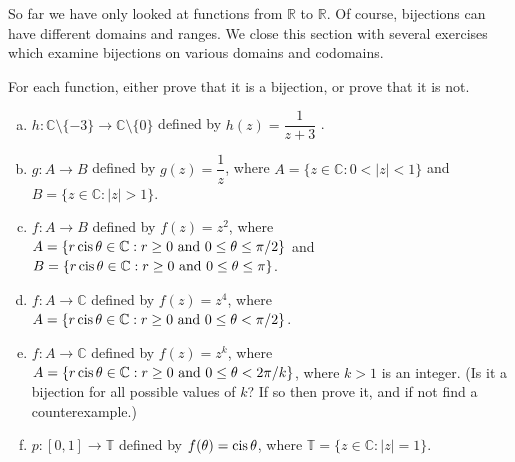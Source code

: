  
So far we have only looked at functions from $\mathbb{R}$ to $\mathbb{R}$.  Of course, bijections can have different domains and ranges. We close this section with several exercises which examine bijections on 
various domains and  codomains.

\begin{exercise}{} 
For each function, either prove that it is a bijection, or prove that it is not.
\begin{enumerate}[(a)]
\item
 $h \colon {\mathbb C}\setminus \{-3\}  \to {\mathbb C}\setminus \{0\} $ defined by $h(z) =  \dfrac{1}{z+3}$ .
\item
 $g \colon A   \to B $ defined by $g(z) =  \dfrac{1}{z}$, where $A =  \{z \in \mathbb{C}: 0<|z|<1\}$ and $B =  \{z \in \mathbb{C}: |z|>1\}$.
\item
 $f \colon A   \to B $ defined by $f(z) =  z^2$, where $A =  \{ r \operatorname{cis} \theta \in \mathbb{C}: r \ge 0 \text{ and } 0 \le \theta \le \pi/2 \}$ and 
$B =  \{ r \operatorname{cis} \theta \in \mathbb{C}: r \ge 0 \text{ and } 0 \le \theta \le \pi \}$.
\item
 $f \colon A   \to \mathbb{C} $ defined by $f(z) =  z^4$, where $A =  \{ r \operatorname{cis} \theta \in \mathbb{C}: r \ge 0 \text{ and } 0 \le \theta < \pi/2 \}$.
\item
 $f \colon A   \to \mathbb{C} $ defined by $f(z) =  z^k$, where $A =  \{ r \operatorname{cis} \theta \in \mathbb{C}: r \ge 0 \text{ and } 0 \le \theta < 2\pi/k \}$, where $k>1$ is an integer.  (Is it a bijection for all possible values of $k$? If so then prove it, and if not find a counterexample.)
\item
 $p \colon [0,1]   \to \mathbb{T} $ defined by $f(\theta) =  \operatorname{cis} \theta$, where $\mathbb{T} =  \{ z \in \mathbb{C}: |z|=1 \}$.
 \end{enumerate}
\end{exercise}


